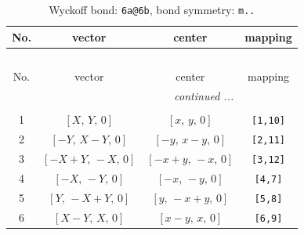 \documentclass[fleqn,8pt]{jsarticle}
\begin{document}
\begin{longtable}{cccc}
\caption{Wyckoff bond: {\tt 6a@6b}, bond symmetry: {\tt m..}}
 \\
 \hline \hline
No. & vector & center & mapping \\ \hline \endfirsthead

\multicolumn{3}{l}{\tablename\ \thetable{}} \\
 \hline \hline
No. & vector & center & mapping \\ \hline \endhead

 \hline \hline
\multicolumn{3}{r}{\footnotesize\it continued ...} \\ \endfoot

 \hline \hline
\multicolumn{3}{r}{} \\ \endlastfoot

1 & $\left[ X,\, Y,\, 0 \right]$ & $\left[ x,\, y,\, 0 \right]$ & {\tt [1,10]} \\ \hline
2 & $\left[ - Y,\, X - Y,\, 0 \right]$ & $\left[ - y,\, x - y,\, 0 \right]$ & {\tt [2,11]} \\ \hline
3 & $\left[ - X + Y,\, - X,\, 0 \right]$ & $\left[ - x + y,\, - x,\, 0 \right]$ & {\tt [3,12]} \\ \hline
4 & $\left[ - X,\, - Y,\, 0 \right]$ & $\left[ - x,\, - y,\, 0 \right]$ & {\tt [4,7]} \\ \hline
5 & $\left[ Y,\, - X + Y,\, 0 \right]$ & $\left[ y,\, - x + y,\, 0 \right]$ & {\tt [5,8]} \\ \hline
6 & $\left[ X - Y,\, X,\, 0 \right]$ & $\left[ x - y,\, x,\, 0 \right]$ & {\tt [6,9]} \\
\end{longtable}
\renewcommand{\arraystretch}{1.2}
\end{document}
